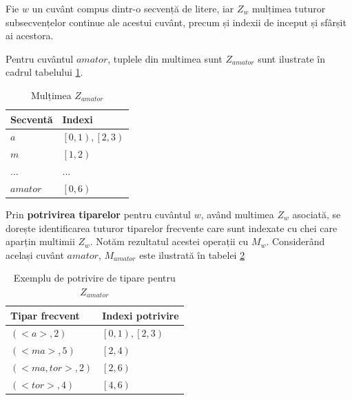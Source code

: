 Fie $w$ un cuvânt compus dintr-o secvență de litere, iar $Z_w$ mulțimea tuturor subsecvențelor continue ale acestui cuvânt, precum și indexii de inceput și sfârșit ai acestora.

\begin{ex}
Pentru cuvântul $amator$, tuplele din multimea sunt $Z_{amator}$ sunt ilustrate în cadrul tabelului \ref{table:sdb_substrings}. 
\end{ex}


\begin{table}[h!]
\centering    
\begin{tabular}{|l|l|}    
\hline      
Secventă & Indexi\\
\hline
$a$ 		& $\left[0,1\right), \left[2,3\right)$  \\
$m$ 		& $\left[1,2\right)$  \\
... 		& ...  \\
$amator$ 	& $\left[0,6\right)$  \\

\hline
\end{tabular}
\caption{Mulțimea $Z_{amator}$}
\label{table:sdb_substrings}               
\end{table}  

\begin{defi} Prin \textbf{potrivirea tiparelor} pentru cuvântul $w$, având multimea $Z_w$ asociată, se dorește identificarea tuturor tiparelor frecvente care sunt indexate cu chei care aparțin multimii $Z_w$. Notăm rezultatul acestei operații cu $M_w$. Considerând același cuvânt $amator$, $M_{amator}$ este ilustrată în tabelei \ref{table:sdb_pattern_match}
\end{defi}

\begin{table}[h!]
\centering    
\begin{tabular}{|l|l|}    
\hline      
Tipar frecvent & Indexi potrivire\\
\hline
$(<a>, 2)$			& $\left[0,1\right), \left[2,3\right)$   \\
$(<ma>, 5)$  		& $\left[2,4\right)$\\
$(<ma, tor>, 2)$ 	& $\left[2,6\right)$ \\
$(<tor>, 4)$  		& $\left[4,6\right)$\\
\hline
\end{tabular}
\caption{Exemplu de potrivire de tipare pentru $Z_{amator}$}
\label{table:sdb_pattern_match}               
\end{table}  


